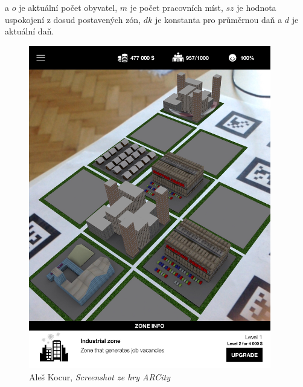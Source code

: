 \documentclass[twoside,12pt]{article}
\begin{document}
a $o$ je aktuální počet obyvatel, $m$ je počet pracovních míst, $sz$ je hodnota uspokojení z dosud postavených zón, $dk$ je konstanta pro průměrnou daň a $d$ je aktuální daň.


\begin{figure}[H]
\centering
    \includegraphics[width=400px, center]{images/screenshot1.jpg}
\captionsetup{justification=centering}
    \caption{Aleš Kocur, \textit{Screenshot ze hry ARCity}}
    \label{screenshot3}
\end{figure}
\end{document}
